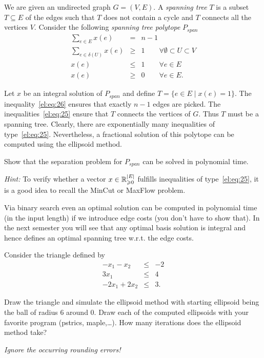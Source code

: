 \begin{exercise}
  \label{el:ex:10}
  We are given an undirected graph $G=(V,E)$. A \emph{spanning tree}
  $T$ is a subset $T\subseteq E$ of the edges such that $T$ does not contain
  a cycle and $T$ connects all the vertices $V$. Consider the
  following \emph{spanning tree polytope} $P_{span}$
\begin{eqnarray}
 \sum_{e\in E} x(e)       & = & n-1  \label{el:eq:26}\\
 \sum_{e\in \delta(U)} x(e)   & \geq & 1  \quad \quad \forall \emptyset \subset U \subset V  \label{el:eq:25}\\
                 x(e)  & \leq & 1 \quad \quad  \forall e\in E \\
                 x(e)  & \geq & 0 \quad \quad  \forall e\in E. 
\end{eqnarray}

Let $x$ be an integral solution of $P_{span}$ and define $T=\{e\in E \mid
x(e)=1\}$. The inequality~\eqref{el:eq:26} ensures that exactly $n-1$ edges are
picked. The  inequalities~\eqref{el:eq:25} ensure that $T$ connects the
vertices 
of $G$.  Thus $T$ must be a spanning tree.  Clearly, there are
exponentially many inequalities of type~\eqref{el:eq:25}.  Nevertheless,
a fractional solution of this polytope can be computed using the
ellipsoid method.

Show that the separation problem for $P_{span}$ can be solved in
polynomial time. 

\emph{Hint:} To verify whether a vector $x\in \mathbb{R}_{\geqslant0}^{|E|}$ fulfills
inequalities of type~\eqref{el:eq:25}, it is a good idea to recall the
MinCut or MaxFlow problem.

{\small 
\noindent 
Via binary search even an optimal solution can be computed in
polynomial time (in the input length) if we introduce edge costs (you
don't have to show that). In the next semester you will see that any
optimal basis solution is integral and hence defines an optimal
spanning tree w.r.t. the edge costs.
}
\end{exercise}

\begin{exercise}
  \label{el:ex:7}
  Consider the triangle defined by
  \begin{eqnarray*}
    -x_1-x_2 & \leq & -2 \\
    3 x_1     & \leq & 4\\
    -2x_1 + 2x_2 & \leq & 3.
  \end{eqnarray*}
  
  Draw the triangle and simulate the ellipsoid method with starting
  ellipsoid being the ball of radius $6$ around $0$. Draw each of the
  computed ellipsoids with your favorite program (pstrics, maple,\ldots ).
  How many iterations does the ellipsoid method take?

  \emph{Ignore the occurring rounding errors!} 
\end{exercise}

